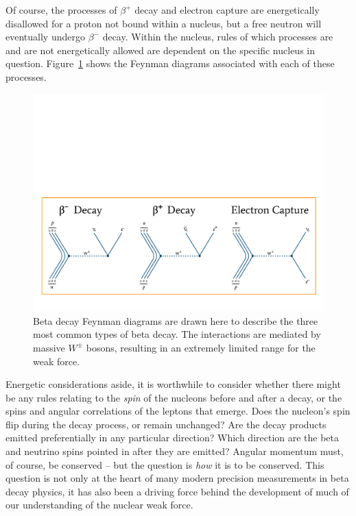 Of course, the processes of $\beta^+$ decay and electron capture are energetically disallowed for a proton not bound within a nucleus, but a free neutron will eventually undergo $\beta^-$ decay.  
Within the nucleus, rules of which processes are and are not energetically allowed are dependent on the specific nucleus in question.  Figure~\ref{fig:feynmandiagrams_betadecay} shows the Feynman diagrams associated with each of these processes.   
\begin{figure}[h!t!b!]
	\centering
	\includegraphics[width=1.0\linewidth]{Figures/BetaDecayFeynmanDiagrams.pdf}
	\caption[Beta Decay Feynman Diagrams]{Beta decay Feynman diagrams are drawn here to describe the three most common types of beta decay.  The interactions are mediated by massive $W^\pm$ bosons, resulting in an extremely limited range for the weak force.  
	}	
	\label{fig:feynmandiagrams_betadecay}
\end{figure}

Energetic considerations aside, it is worthwhile to consider whether there might be any rules relating to the \emph{spin} of the nucleons before and after a decay, or the spins and angular correlations of the leptons that emerge.  Does the nucleon's spin flip during the decay process, or remain unchanged?  Are the decay products emitted preferentially in any particular direction?  Which direction are the beta and neutrino spins pointed in after they are emitted?  Angular momentum must, of course, be conserved -- but the question is \emph{how} it is to be conserved.  This question is not only at the heart of many modern precision measurements in beta decay physics, it has also been a driving force behind the development of much of our understanding of the nuclear weak force.


